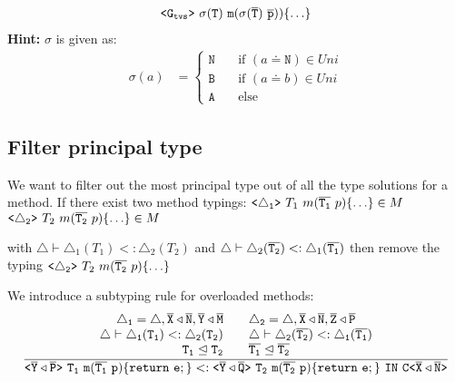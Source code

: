 \documentclass[a4paper,USenglish,cleveref, autoref, thm-restate]{lipics-v2021}
\begin{document}
\begin{enumerate}
\begin{align*}
\mathtt{\mathtt{ \texttt{<} G_{tvs} \texttt{>} }\ \sigma(T)\ m(\sigma(\overline{\tt T})\ \overline{\tt p}))\{ \ldots \}}
\end{align*}
\textbf{Hint:}
$\sigma$ is given as:
\begin{align*}
\sigma(a) &= 
\begin{cases}
  \texttt{N}       & \quad \text{if } (a \doteq \texttt{N}) \in Uni \\
  \texttt{B}       & \quad \text{if } (a \doteq b) \in Uni \\
  \texttt{A}       & \quad \text{else}
\end{cases}
\end{align*}
\end{enumerate}

\subsection{Filter principal type}
We want to filter out the most principal type out of all the type solutions for a method.
If there exist two method typings:
$\mathtt{ \texttt{<} \triangle_1 \texttt{>} }\ T_1\ m(\overline{\tt T_1}\ p)\{ \ldots \} \in M$\\
$\mathtt{ \texttt{<} \triangle_2 \texttt{>} }\ T_2\ m(\overline{\tt T_2}\ p)\{ \ldots \} \in M$

with $\triangle \vdash \triangle_1(T_1) <: \triangle_2(T_2)$
and $\triangle \vdash \triangle_2(\overline{\tt T_2}) <: \triangle_1(\overline{\tt T_1})$
then remove the typing 
$\mathtt{ \texttt{<} \triangle_2 \texttt{>} }\ T_2\ m(\overline{\tt T_2}\ p)\{ \ldots \}$

We introduce a subtyping rule for overloaded methods:
\begin{align*}
\frac{\displaystyle 
  \begin{array}{c}\mathtt{
  \triangle_1 = \triangle, \overline{\tt X} \triangleleft \overline{\tt N}, \overline{\tt Y} \triangleleft \overline{\tt M} \quad \quad
  \triangle_2 = \triangle, \overline{\tt X} \triangleleft \overline{\tt N}, \overline{\tt Z} \triangleleft \overline{\tt P}
  }\\
  \mathtt{
  \triangle \vdash \triangle_1(T_1) <: \triangle_2(T_2) \quad \quad
  \triangle \vdash \triangle_2(\overline{\tt T_2}) <: \triangle_1(\overline{\tt T_1})
  }\\
  \mathtt{T_1 \trianglelefteq T_2 \quad \quad \overline{\tt T_1} \trianglelefteq \overline{\tt T_2}}
  \end{array}
  }{\displaystyle 
    \mathtt{
  \mathtt{ \texttt{<} \overline{\tt Y} \triangleleft \overline{\tt P} \texttt{>} }\ T_1\ m(\overline{\tt T_1}\ p)\{ \texttt{return}\ e; \} <: \mathtt{ \texttt{<} \overline{\tt Y} \triangleleft \overline{\tt Q} \texttt{>} }\ T_2\ m(\overline{\tt T_2}\ p)\{ \texttt{return}\ e; \}
  \ \texttt{IN}\ \mathtt{C \texttt{<} \overline{\tt X} \triangleleft \overline{\tt N} \texttt{>} }
  }
}
\end{align*}
\end{document}
